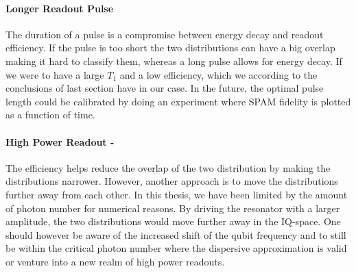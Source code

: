 \paragraph{Longer Readout Pulse} The duration of a pulse is a compromise between energy decay and readout efficiency. If the pulse is too short the two distributions can have a big overlap making it hard to classify them, whereas a long pulse allows for energy decay. If we were to have a large $T_1$ and a low efficiency, which we according to the conclusions of last section have in our case. In the future, the optimal pulse length could be calibrated by doing an experiment where SPAM fidelity is plotted as a function of time. 

\paragraph{High Power Readout - } The efficiency helps reduce the overlap of the two distribution by making the distributions narrower. However, another approach is to move the distributions further away from each other. In this thesis, we have been limited by the amount of photon number for numerical reasons. By driving the resonator with a larger amplitude, the two distributions would move further away in the IQ-space. One should however be aware of the increased shift of the qubit frequency and to still be within the critical photon number where the dispersive approximation is valid or venture into a new realm of high power readouts. 


